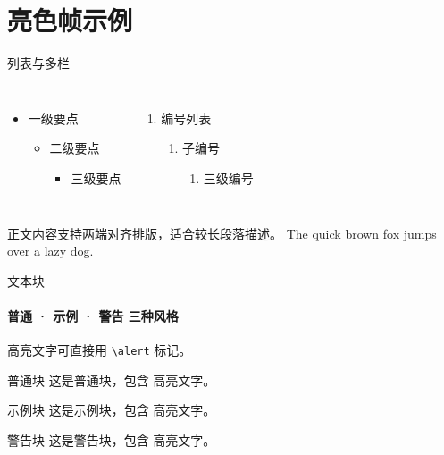 \section{亮色帧示例}

\begin{frame}[label=lists]{列表与多栏}
  \begin{columns}[onlytextwidth]
      \begin{itemize}
        \item 一级要点
        \begin{itemize}
          \item 二级要点
          \begin{itemize}
            \item 三级要点
          \end{itemize}
        \end{itemize}
      \end{itemize}
      \begin{enumerate}
        \item 编号列表
        \begin{enumerate}
          \item 子编号
          \begin{enumerate}
            \item 三级编号
          \end{enumerate}
        \end{enumerate}
      \end{enumerate}
  \end{columns}
  \bigskip
  \justifying
  正文内容支持两端对齐排版，适合较长段落描述。
  The quick brown fox jumps over a lazy dog.
\end{frame}

\begin{frame}[label=blocks]{文本块}
  \framesubtitle{普通 · 示例 · 警告 三种风格}

  \alert{高亮文字}可直接用 \texttt{\textbackslash alert} 标记。

  \begin{block}{普通块}
    这是普通块，包含 \alert{高亮文字}。
  \end{block}
  \begin{exampleblock}{示例块}
    这是示例块，包含 \alert{高亮文字}。
  \end{exampleblock}
  \begin{alertblock}{警告块}
    这是警告块，包含 \alert{高亮文字}。
  \end{alertblock}
\end{frame}


